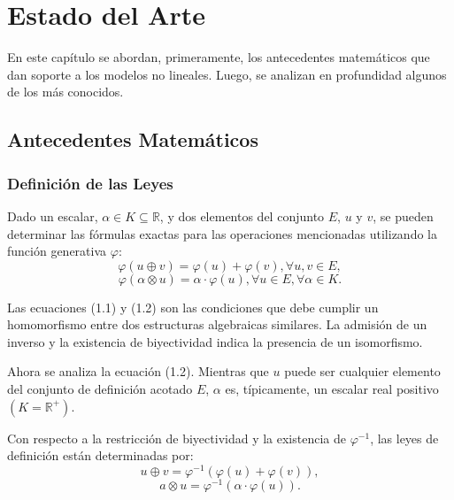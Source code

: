 \chapter{Estado del Arte}\label{chapter:state-of-the-art}

En este cap\'itulo se abordan, primeramente, los antecedentes matem\'aticos que dan soporte a los modelos no lineales. Luego, se analizan en profundidad algunos de los m\'as conocidos.

\section{Antecedentes Matemáticos}

\subsection{Definición de las Leyes}

Dado un escalar, $\alpha \in K \subseteq \mathbb{R}$, y dos elementos del conjunto $E$, $u$ y $v$, se pueden determinar las fórmulas exactas para las operaciones mencionadas utilizando la función generativa $\varphi$:
\begin{equation}
	\varphi(u\oplus v) = \varphi(u)+\varphi(v), \forall u,v \in E,
\end{equation}
\begin{equation}
	\varphi(\alpha \otimes u) = \alpha \cdot \varphi(u), \forall u \in E, \forall \alpha \in K.
\end{equation}

Las ecuaciones (1.1) y (1.2) son las condiciones que debe cumplir un homomorfismo entre dos estructuras algebraicas similares. La admisi\'on de un inverso y la existencia de biyectividad indica la presencia de un isomorfismo.

Ahora se analiza la ecuación (1.2). Mientras que $u$ puede ser cualquier elemento del conjunto de definici\'on acotado $E$, $\alpha$ es, típicamente, un escalar real positivo $(K=\mathbb{R}^+)$.

Con respecto a la restricción de biyectividad y la existencia de $\varphi^{-1}$, las leyes de definición están determinadas por:
\begin{equation}
	u \oplus v = \varphi^{-1}(\varphi(u)+\varphi(v)),	
\end{equation}
\begin{equation}	
	a \otimes u = \varphi^{-1}(\alpha\cdot\varphi(u)).
\end{equation} 

